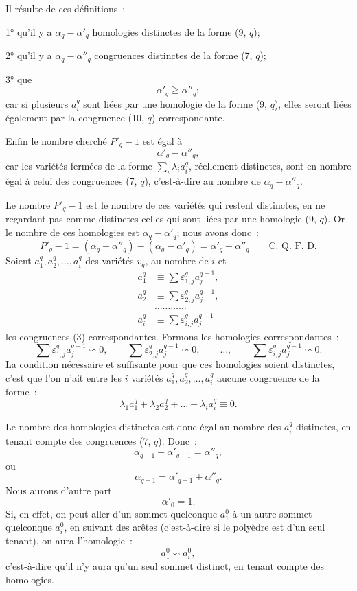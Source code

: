 \documentclass{article}
\begin{document}
Il résulte de ces définitions~:

1° qu'il y a $\alpha_{q} - \alpha'_{q}$ homologies distinctes de la forme (9, $q$);

2° qu'il y a $\alpha_{q} - \alpha''_{q}$ congruences distinctes de la forme (7, $q$);

3° que
\[ \alpha'_{q} \geqq \alpha''_{q}; \]
car si plusieurs $a^{q}_{i}$ sont liées par une homologie de la forme (9, $q$), elles seront liées également par la congruence (10, $q$) correspondante.

Enfin le nombre cherché $P'_{q} - 1$ est égal à
\[ \alpha'_{q} - \alpha''_{q}, \]
car les variétés fermées de la forme $\displaystyle\sum_{i} \lambda_{i} a^{q}_{i}$, réellement distinctes, sont en nombre égal à celui des congruences (7, $q$), c'est-à-dire au nombre de $\alpha_{q} - \alpha''_{q}$.

Le nombre $P'_{q} - 1$ est le nombre de ces variétés qui restent
distinctes, en ne regardant pas comme distinctes celles qui sont liées par une homologie (9, $q$). Or le nombre de ces homologies est $\alpha_{q} - \alpha'_{q}$; nous avons donc~:
\[ P'_{q} - 1 = (\alpha_{q} - \alpha''_{q}) - (\alpha_{q} - \alpha'_{q}) = \alpha'_{q} - \alpha''_{q} \qquad \text{C.~Q.~F.~D.} \]
Soient $a^{q}_{1}, a^{q}_{2}, \ldots, a^{q}_{i}$ des variétés $v_{q}$, au nombre de $i$ et
\[ \begin{aligned} a^{q}_{1} &\equiv \sum \varepsilon^{q}_{1,j} a^{q-1}_{j}, \\ a^{q}_{2} &\equiv \sum \varepsilon^{q}_{2,j} a^{q-1}_{j}, \\ &\ldots\ldots\ldots\ldots \\ a^{q}_{i} &\equiv \sum \varepsilon^{q}_{i,j} a^{q-1}_{j} \end{aligned} \]
les congruences (3) correspondantes. Formons les homologies correspondantes~:
\[ \sum \varepsilon^{q}_{1,j} a^{q-1}_{j} \backsim 0, \qquad \sum \varepsilon^{q}_{2,j} a^{q-1}_{j} \backsim 0, \qquad \ldots, \qquad \sum \varepsilon^{q}_{i,j} a^{q-1}_{j} \backsim 0. \]
La condition nécessaire et suffisante pour que ces homologies soient distinctes, c'est que l'on n'ait entre les $i$ variétés $a^{q}_{1}, a^{q}_{2}, \ldots, a^{q}_{i}$ aucune congruence de la forme~:
\[ \lambda_{1} a^{q}_{1} + \lambda_{2} a^{q}_{2} + \ldots + \lambda_{i} a^{q}_{i} \equiv 0. \]

Le nombre des homologies distinctes est donc égal au nombre des $a^{q}_{i}$ distinctes, en tenant compte des congruences (7, $q$). Donc~:
\[ \alpha_{q-1} - \alpha'_{q-1} = \alpha''_{q}, \]
ou
\[ \alpha_{q-1} = \alpha'_{q-1} + \alpha''_{q}. \]
Nous aurons d'autre part
\[ \alpha'_{0} = 1. \]
Si, en effet, on peut aller d'un sommet quelconque $a^{0}_{1}$ à un autre
sommet quelconque $a^{0}_{i}$, en suivant des arêtes (c'est-à-dire si le polyèdre est d'un seul tenant), on aura l'homologie~:
\[ a^{0}_{1} \backsim a^{0}_{i}, \]
c'est-à-dire qu'il n'y aura qu'un seul sommet distinct, en tenant compte des homologies.
\end{document}
